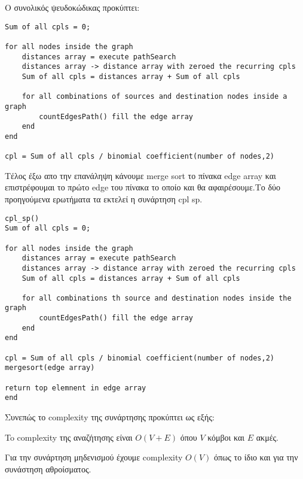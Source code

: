 \documentclass{article}
\begin{document}
Ο συνολικός ψευδοκώδικας προκύπτει:
\bigbreak
{}

\begin{lstlisting}
Sum of all cpls = 0;

for all nodes inside the graph
	distances array = execute pathSearch
	distances array -> distance array with zeroed the recurring cpls
	Sum of all cpls = distances array + Sum of all cpls
	
	for all combinations of sources and destination nodes inside a graph
		countEdgesPath() fill the edge array
	end 
end

cpl = Sum of all cpls / binomial coefficient(number of nodes,2)
\end{lstlisting}\bigbreak
{}

Τέλος έξω απο την επανάληψη κάνουμε merge sort το πίνακα edge array και επιστρέφουμαι το πρώτο edge του πίνακα το οποίο και θα αφαιρέσουμε.Το δύο προηγούμενα ερωτήματα τα εκτελεί η συνάρτηση cpl sp.\pagebreak

\begin{lstlisting}
cpl_sp()
Sum of all cpls = 0;

for all nodes inside the graph
	distances array = execute pathSearch
	distances array -> distance array with zeroed the recurring cpls
	Sum of all cpls = distances array + Sum of all cpls
	
	for all combinations th source and destination nodes inside the graph
		countEdgesPath() fill the edge array
	end 
end

cpl = Sum of all cpls / binomial coefficient(number of nodes,2)
mergesort(edge array)

return top elemnent in edge array
end
\end{lstlisting}\bigbreak
{}

Συνεπώς το complexity της συνάρτησης προκύπτει ως εξής:\bigbreak

To complexity της αναζήτησης είναι $Ο(V+E)$ όπου $V$ κόμβοι και $Ε$ ακμές.\bigbreak

Για την συνάρτηση μηδενισμού έχουμε complexity
$O(V)$ όπως το ίδιο και για την συνάστηση αθροίσματος.\bigbreak
\end{document}
